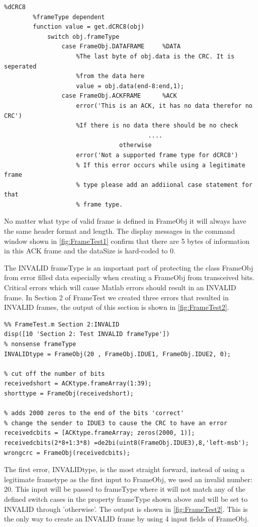 \begin{lstlisting} 
%dCRC8
        %frameType dependent
        function value = get.dCRC8(obj)
            switch obj.frameType
                case FrameObj.DATAFRAME     %DATA
                    %The last byte of obj.data is the CRC. It is seperated
                    %from the data here
                    value = obj.data(end-8:end,1);
                case FrameObj.ACKFRAME      %ACK
                    error('This is an ACK, it has no data therefor no CRC')
                    %If there is no data there should be no check
										....
								otherwise
                    error('Not a supported frame type for dCRC8')
                    % If this error occurs while using a legitimate frame
                    % type please add an addiional case statement for that
                    % frame type.
\end{lstlisting}

No matter what type of valid frame is defined in FrameObj it will always have the same header format and length. The display messages in the command window shown in \ref{fig:FrameTest1} confirm that there are 5 bytes of information in this ACK frame and the dataSize is hard-coded to 0. 

The INVALID frameType is an important part of protecting the class FrameObj from error filled data especially when creating a FrameObj from transceived bits. Critical errors which will cause Matlab errors should result in an INVALID frame. In Section 2 of FrameTest we created three errors that resulted in INVALID frames, the output of this section is shown in \ref{fig:FrameTest2}.

\begin{lstlisting} 
%% FrameTest.m Section 2:INVALID
disp([10 'Section 2: Test INVALID frameType'])
% nonsense frameType
INVALIDtype = FrameObj(20 , FrameObj.IDUE1, FrameObj.IDUE2, 0);

% cut off the number of bits
receivedshort = ACKtype.frameArray(1:39);
shorttype = FrameObj(receivedshort);

% adds 2000 zeros to the end of the bits 'correct'
% change the sender to IDUE3 to cause the CRC to have an error
receivedcbits = [ACKtype.frameArray; zeros(2000, 1)];
receivedcbits(2*8+1:3*8) =de2bi(uint8(FrameObj.IDUE3),8,'left-msb');
wrongcrc = FrameObj(receivedcbits);
\end{lstlisting} 

The first error, INVALIDtype, is the most straight forward, instead of using a legitimate frametype as the first input to FrameObj, we used an invalid number: 20. This input will be passed to frameType where it will not match any of the defined switch cases in the property frameType shown above and will be set to INVALID through 'otherwise'. The output is shown in \ref{fig:FrameTest2}.  This is the only way to create an INVALID frame by using 4 input fields of FrameObj. 

